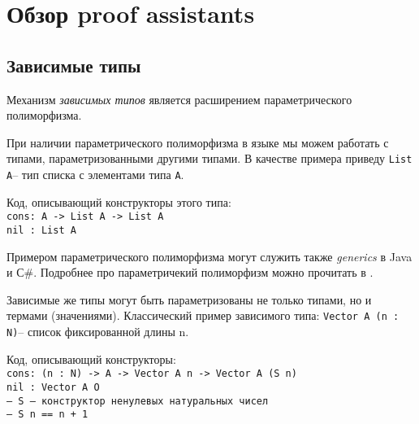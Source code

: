 \documentclass[aps,12pt,final,oneside,onecolumn,musixtex,superscriptaddress,centertags]{article}
\newcommand{\ctab}[0]{\indent\indent}
\newcommand{\ccode}[1]{\mbox{\texttt{#1}}}
\begin{document}
  \section{Обзор proof assistants}
  \subsection{Зависимые типы}
     Механизм \emph{зависимых типов} является расширением параметрического полиморфизма.

     \newcommand{\listtype}[0]{\ccode{List A}} 
     \newcommand{\listcons}[0]{\ccode{cons\hspace{2mm}: A -> List A -> List A}}
     \newcommand{\listnil}[0]{\ccode{nil \hspace{2mm}: List A}}
     \newcommand{\listconst}[0]{
        \ctab\listcons\\
        \ctab\listnil
     }

     При наличии параметрического полиморфизма в языке мы можем работать с типами, параметризованными другими типами. В качестве примера приведу \listtype\:-- тип списка с элементами типа \ccode{A}.

     Код, описывающий конструкторы этого типа:\\
     \listconst
     \newline

     Примером параметрического полиморфизма могут служить также \emph{generics} в Java и С\#. Подробнее про параметричекий полиморфизм можно прочитать в \cite{DBLP:journals/lisp/Strachey00}.

     \newcommand{\vectortype}[0]{\ccode{Vector A (n : N)}}
     \newcommand{\vectorcons}[0]{\ccode{cons\hspace{2mm}: (n : N) -> A -> Vector A n -> Vector A (S n)}}
     \newcommand{\vectornil}[0]{\ccode{nil \hspace{2mm}: Vector A O}}
     \newcommand{\vectorconst}[0]{
     \ctab\vectorcons\\
     \ctab\vectornil\\
     \ctab\ccode{--- S -- конструктор ненулевых натуральных чисел}\\
     \ctab\ccode{--- S n == n + 1}
     }
     \newcommand{\vectorheadtype}[0]{\ccode{(n : N) -> Vector A (S n) -> A}}

     Зависимые же типы могут быть параметризованы не только типами, но и термами (значениями). Классический пример зависимого типа: \vectortype\:-- список фиксированной длины n.

     Код, описывающий конструкторы:\\
     \vectorconst
     \newline
\end{document}
